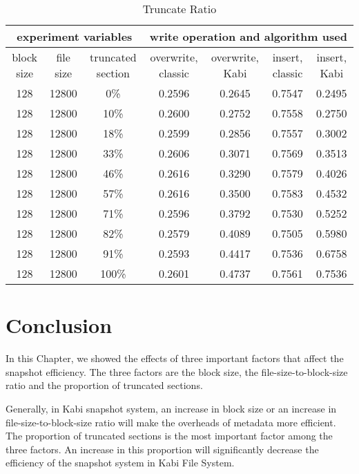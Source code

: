 \begin{lscape} 
\begin{table}[t]
\caption{Truncate Ratio}
\label{tab:truncate_ratio}
\begin{center}
\begin{tabular}{|c|c|c|c|c|c|c|}
\hline
\multicolumn{3}{|c|}{experiment variables} & \multicolumn{4}{c|}{write operation and algorithm used} \\
\hline
block size & file size & truncated section & overwrite, classic & overwrite, Kabi & insert, classic & insert, Kabi\\
\hline
128 & 12800 & 0\% & 0.2596 & 0.2645 & 0.7547 & 0.2495 \\
\hline
128 & 12800 & 10\% & 0.2600 & 0.2752 & 0.7558 & 0.2750 \\
\hline
128 & 12800 & 18\% & 0.2599 & 0.2856 & 0.7557 & 0.3002 \\
\hline
128 & 12800 & 33\% & 0.2606 & 0.3071 & 0.7569 & 0.3513 \\
\hline
128 & 12800 & 46\% & 0.2616 & 0.3290 & 0.7579 & 0.4026 \\
\hline
128 & 12800 & 57\% & 0.2616 & 0.3500 & 0.7583 & 0.4532 \\
\hline
128 & 12800 & 71\% & 0.2596 & 0.3792 & 0.7530 & 0.5252 \\
\hline
128 & 12800 & 82\% & 0.2579 & 0.4089 & 0.7505 & 0.5980 \\
\hline
128 & 12800 & 91\% & 0.2593 & 0.4417 & 0.7536 & 0.6758 \\
\hline
128 & 12800 & 100\% & 0.2601 & 0.4737 & 0.7561 & 0.7536 \\
\hline
\end{tabular}
\end{center}
\end{table}
\end{lscape}

\section{Conclusion}

    In this Chapter, we showed the effects of three important factors that affect the snapshot efficiency. The three factors are the block size, the file-size-to-block-size ratio and the proportion of truncated sections.

    Generally, in Kabi snapshot system, an increase in block size or an increase in file-size-to-block-size ratio will make the overheads of metadata more efficient. The proportion of truncated sections is the most important factor among the three factors. An increase in this proportion will significantly decrease the efficiency of the snapshot system in Kabi File System.
